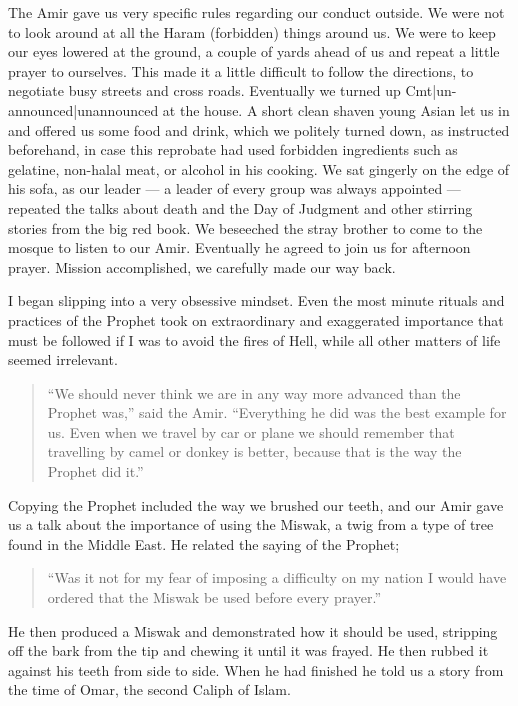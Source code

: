 \documentclass[12pt]{memoir}
\begin{document}
The Amir gave us very specific rules regarding our conduct outside.
We were not to look around at all the Haram (forbidden) things around us.
We were to keep our eyes lowered at the ground,
a couple of yards ahead of us and repeat a little prayer to ourselves.
This made it a little difficult to follow the directions,
to negotiate busy streets and cross roads.
Eventually we turned up {{Cmt|un-announced|unannounced}} at the house.
A short clean shaven young Asian let us in and offered us some food and drink,
which we politely turned down, as instructed beforehand,
in case this reprobate had used forbidden ingredients such as gelatine,
non-halal meat, or alcohol in his cooking.
We sat gingerly on the edge of his sofa, as our leader —
a leader of every group was always appointed —
repeated the talks about death and the Day of Judgment
and other stirring stories from the big red book.
We beseeched the stray brother to come to the mosque to listen to our Amir.
Eventually he agreed to join us for afternoon prayer.
Mission accomplished, we carefully made our way back.

I began slipping into a very obsessive mindset.
Even the most minute rituals and practices of the Prophet
took on extraordinary and exaggerated importance
that must be followed if I was to avoid the fires of Hell,
while all other matters of life seemed irrelevant.

\begin{quote}
“We should never think we are in any way more advanced
than the Prophet was,” said the Amir.
“Everything he did was the best example for us.
Even when we travel by car or plane we should remember
that travelling by camel or donkey is better,
because that is the way the Prophet did it.”
\end{quote}

Copying the Prophet included the way we brushed our teeth,
and our Amir gave us a talk about the importance of using the Miswak,
a twig from a type of tree found in the Middle East.
He related the saying of the Prophet;

\begin{quote}
“Was it not for my fear of imposing a difficulty on my nation
I would have ordered that the Miswak be used before every prayer.”
\end{quote}

He then produced a Miswak and demonstrated how it should be used,
stripping off the bark from the tip and chewing it until it was frayed.
He then rubbed it against his teeth from side to side.
When he had finished he told us a story from the time of Omar,
the second Caliph of Islam.
\end{document}
